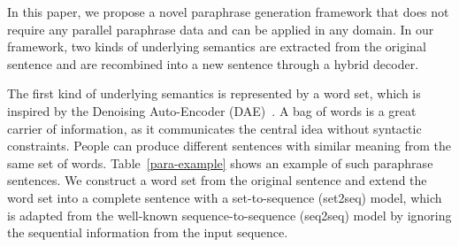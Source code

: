 % 


In this paper, we propose a novel paraphrase generation framework that does not require any parallel paraphrase data and can be applied in any domain. 
In our framework, two kinds of underlying semantics are extracted from 
the original sentence and are recombined into a new sentence through 
a hybrid decoder.


The first kind of underlying semantics is represented by a word set, 
which is inspired by the Denoising Auto-Encoder (DAE)~\cite{denoisingAE}. 
A bag of words is a great carrier of information, 
as it communicates the central idea without syntactic constraints. 
People can produce different sentences with similar meaning from the same 
set of words. Table~\ref{para-example} shows an example of such 
paraphrase sentences. We construct a word set from the 
original sentence and extend the word set into a complete sentence 
with a set-to-sequence (set2seq) model, %
which is adapted from the well-known sequence-to-sequence (seq2seq) model 
by ignoring the sequential information from the input sequence.

